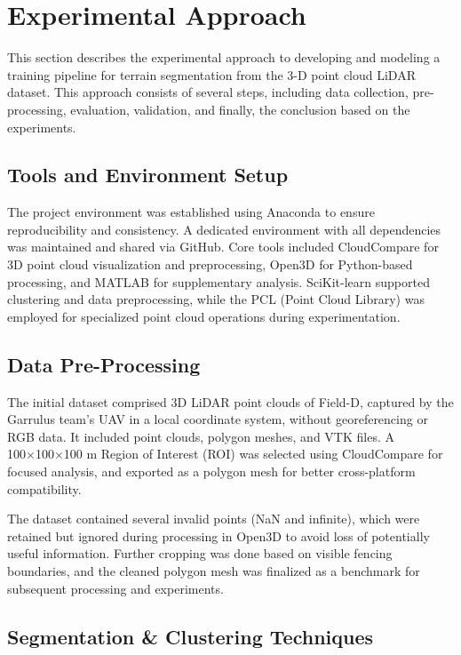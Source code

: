 \documentclass[../report.tex]{subfiles}
\begin{document}
    \section{Experimental Approach}
    This section describes the experimental approach to developing and modeling a training pipeline for terrain segmentation from the 3-D point cloud LiDAR dataset. This approach consists of several steps, including data collection, pre-processing, evaluation, validation, and finally, the conclusion based on the experiments.
    
    \subsection{Tools and Environment Setup}
    The project environment was established using Anaconda to ensure reproducibility and consistency. A dedicated environment with all dependencies was maintained and shared via GitHub\cite{github}. Core tools included CloudCompare\cite{CloudCompare} for 3D point cloud visualization and preprocessing, Open3D for Python-based processing, and MATLAB\cite{matlab} for supplementary analysis. SciKit-learn supported clustering and data preprocessing, while the PCL (Point Cloud Library)\cite{PCL} was employed for specialized point cloud operations during experimentation.

    \subsection{Data Pre-Processing}
    The initial dataset comprised 3D LiDAR point clouds of Field-D, captured by the Garrulus team’s UAV in a local coordinate system, without georeferencing or RGB data. It included point clouds, polygon meshes, and VTK files. A 100×100×100 m Region of Interest (ROI) was selected using CloudCompare for focused analysis, and exported as a polygon mesh for better cross-platform compatibility.

    The dataset contained several invalid points (NaN and infinite), which were retained but ignored during processing in Open3D to avoid loss of potentially useful information. Further cropping was done based on visible fencing boundaries, and the cleaned polygon mesh was finalized as a benchmark for subsequent processing and experiments.
    
    \subsection{Segmentation & Clustering Techniques}
\end{document}
